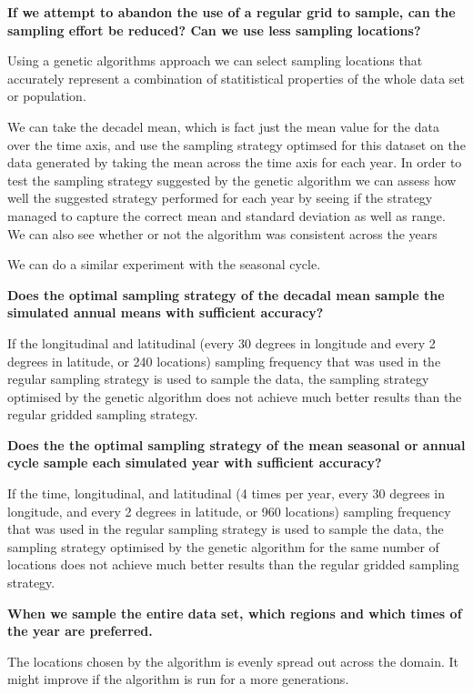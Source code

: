 \documentclass[11pt, a4paper]{article}
\numberwithin{figure}{section}
\numberwithin{table}{section}
\begin{document}
\textbf{If we attempt to abandon the use of a regular grid to sample, can the sampling
effort be reduced? Can we use less sampling locations?} 

Using a genetic algorithms approach we can select sampling locations that 
accurately represent a combination of statitistical properties of the
whole data set or population. 

We can take the decadel mean, which is fact
just the mean value for the data over the time axis, and use the 
sampling strategy optimsed for this dataset on the data generated by
taking the mean across the time axis for each year. 
In order to test the sampling strategy suggested by the genetic algorithm
we can assess how well the suggested strategy performed for each year
by seeing if the strategy managed to capture the correct mean and standard
deviation as well as range. We can also see whether or not the algorithm
was consistent across the years 

We can do a similar experiment with the seasonal cycle.

\textbf{Does the optimal sampling strategy of the decadal mean sample the simulated 
annual means with sufficient accuracy?}

If the longitudinal and latitudinal (every 30 degrees in longitude and every 2 degrees in 
latitude, or 240 locations) sampling frequency that was used in the regular 
sampling strategy is used to sample the data, the sampling strategy optimised by the genetic algorithm
does not achieve much better results than the regular gridded sampling strategy.

\textbf{Does the the optimal sampling strategy of the mean seasonal or annual cycle 
sample each simulated year with sufficient accuracy?}

If the time, longitudinal, and latitudinal (4 times per year, every 30 degrees in longitude, and every 2 degrees in 
latitude, or 960 locations) sampling frequency that was used in the regular 
sampling strategy is used to sample the data, the sampling strategy optimised by the genetic algorithm
for the same number of locations does not achieve much better results than the regular gridded sampling strategy.

\textbf{When we sample the entire data set, which regions and which times of the 
year are preferred.} 

The locations chosen by the algorithm is evenly spread out across the domain.
It might improve if the algorithm is run for a more generations.
\end{document}
